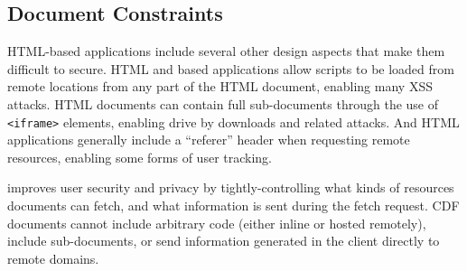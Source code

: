 \subsection{Document Constraints}
\label{sec:design:doc-constraints}
HTML-based applications include several other design aspects that make them
difficult to secure.  HTML and \JS based applications allow scripts to be
loaded from remote locations from any part of the HTML document, enabling
many XSS attacks.  HTML documents can contain full sub-documents
through the use of \texttt{<iframe>} elements, enabling drive by downloads and related
attacks.  And HTML applications generally include a ``referer'' header
when requesting remote resources, enabling some forms of user tracking.

\CDF improves user security and privacy by tightly-controlling what kinds of
resources documents can fetch, and what information is sent during the fetch
request.  CDF documents cannot include arbitrary code (either
inline or hosted remotely), include sub-documents, or send information
generated in the client directly to remote domains.
